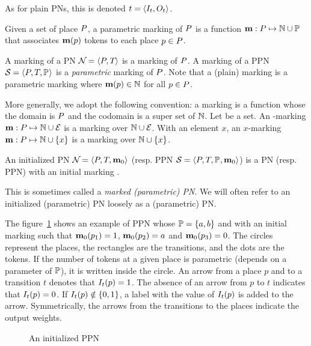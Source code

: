 As for plain \acp{PN}, this is denoted $t = \tuple{\inw[t], \outw[t]}$.

\begin{defi}
  Given a set of place $P$, a parametric marking of $P$ is a function $\mathbf{m} : P \mapsto \mathbb{N} \cup \mathbb{P}$ that associates $\mathbf{m}(p)$ tokens to each place $p \in P$.
\end{defi}

A marking of a \ac{PN} $\mathcal{N}_{} = \left\langle P_{}, T_{}\right\rangle$ is a marking of $P$.
A marking of a \ac{PPN} $\mathcal{S}_{{}} = \left\langle P_{}, T_{}, \mathbb{P}_{}\right\rangle$ is a \emph{parametric} marking of $P$.
Note that a (plain) marking \mar is a parametric marking where $\mathbf{m}(p) \in \mathbb{N}$ for all $p \in P$.

More generally, we adopt the following convention:
a marking is a function whose the domain is $P$ and the codomain is a super set of $\mathbb{N}$.
Let \set be a set. An \set-marking $\mathbf{m} : P \mapsto \mathbb{N} \cup \mathcal{E}$ is a marking over $\mathbb{N} \cup \mathcal{E}$.
With an element $x$, an $x$-marking $\mathbf{m} : P \mapsto \mathbb{N} \cup \{x\}$ is a marking over $\mathbb{N} \cup \{x\}$.

\begin{defi}
  An initialized \ac{PN} $\defPN$ (resp. \ac{PPN} $\defPPN$) is a \ac{PN} (resp. \ac{PPN}) with an initial marking \mari.
\end{defi}

This is sometimes called a \emph{marked (parametric) \ac{PN}}.
We will often refer to an initialized (parametric) \ac{PN} loosely as a (parametric) \ac{PN}.

The figure~\ref{fig:parametric-petri-net-example} shows an example of \ac{PPN} whose $\parameters = \{\param[1], \param[2]\}$ and with an initial marking \mari such that $\mathbf{m}_0(p_1) = 1$, $\mari(p_2) = \param[1]$ and $\mathbf{m}_0(p_3) = 0$.
The circles represent the places, the rectangles are the transitions, and the dots are the tokens.
If the number of tokens at a given place is parametric (\ie depends on a parameter of $\mathbb{P}$), it is written inside the circle.
An arrow from a place $p$ and to a transition $t$ denotes that $\inw[t](p) = 1$.
The absence of an arrow from $p$ to $t$ indicates that $\inw[t](p) = 0$.
If $\inw[t](p) \notin \{0, 1\}$, a label with the value of $\inw[t](p)$ is added to the arrow.
Symmetrically, the arrows from the transitions to the places indicate the output weights.

\begin{figure}[htbp]
  \centering
  
  \par
  \caption{An initialized \ac{PPN}}
  \label{fig:parametric-petri-net-example}
\end{figure}

